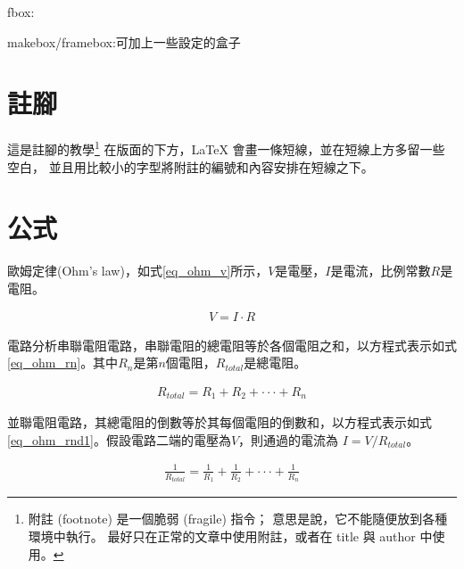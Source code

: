 fbox:

makebox/framebox:可加上一些設定的盒子

\hbox{}


\newpage
\section{註腳}
這是註腳的教學\footnote{附註 (footnote) 是一個脆弱 (fragile) 指令； 意思是說，它不能隨便放到各種環境中執行。 最好只在正常的文章中使用附註，或者在 title 與 author 中使用。}
在版面的下方，LaTeX 會畫一條短線，並在短線上方多留一些空白， 並且用比較小的字型將附註的編號和內容安排在短線之下。
\newpage

\section{公式}

歐姆定律(Ohm's law)，如式\ref{eq_ohm_v}所示，$V$是電壓，$I$是電流，比例常數$R$是電阻。

\begin{equation}\label{eq_ohm_v}
    \begin{split}
        V = I \cdot R
    \end{split}
\end{equation}

電路分析串聯電阻電路，串聯電阻的總電阻等於各個電阻之和，以方程式表示如式\ref{eq_ohm_rn}。其中$R_{n}$是第$n$個電阻，$R_{total}$是總電阻。

\begin{equation}\label{eq_ohm_rn}
    \begin{split}
        R_{total} = R_{1} + R_{2} + \cdot\cdot\cdot + R_{n}
    \end{split}
\end{equation}

並聯電阻電路，其總電阻的倒數等於其每個電阻的倒數和，以方程式表示如式\ref{eq_ohm_rnd1}。假設電路二端的電壓為$V$，則通過的電流為 $I = V / R_{total}$。

\begin{equation}\label{eq_ohm_rnd1}
    \begin{split}
        \frac{1}{R_{total}} = \frac{1}{R_{1}} + \frac{1}{R_{2}} + \cdot\cdot\cdot + \frac{1}{R_{n}}
    \end{split}
\end{equation}
